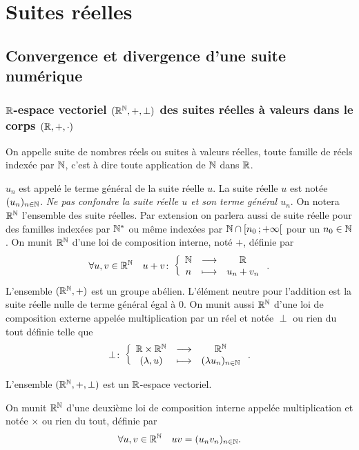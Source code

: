 \chapter{Suites  réelles}
\label{chap:suites}
\minitoc
\minilof
\minilot
\section{Convergence et divergence d'une suite numérique}

\subsection{\(\mathbb{R}\)-espace vectoriel \((\mathbb{R}^{\mathbb{N}},+,\perp)\) des suites réelles à valeurs dans le corps \((\mathbb{R},+, \cdot )\)}

\begin{defdef}
  On appelle suite de nombres réels ou suites à valeurs réelles, toute famille de réels indexée par \(\mathbb{N}\), c'est à dire toute application de \(\mathbb{N}\) dans \(\mathbb{R}\).
\end{defdef}
\(u_n\) est appelé le terme général de la suite réelle \(u\). La suite réelle \(u\) est notée \((u_n)_{n\in\mathbb{N}}\). \emph{Ne pas confondre la suite réelle \(u\) et son terme général \(u_n\)}. On notera \(\mathbb{R}^{\mathbb{N}}\) l'ensemble des suite réelles. Par extension on parlera aussi de suite réelle pour des familles indexées par \(\mathbb{N}^*\) ou même indexées par \(\mathbb{N} \cap \left[ n_0 \, ;  +\infty \right[\) pour un \(n_0 \in \mathbb{N}\). On munit \(\mathbb{R}^{\mathbb{N}}\) d'une loi de composition interne, noté \(+\), définie par
\begin{equation}
  \forall u,v \in \mathbb{R}^{\mathbb{N}} \quad u+v\colon \left\{\begin{array}{ccc} \mathbb{N} & \longrightarrow &\mathbb{R}\\ n & \longmapsto & u_n+v_n \end{array} \right..
\end{equation}
L'ensemble \((\mathbb{R}^{\mathbb{N}},+)\) est un groupe abélien. L'élément neutre pour l'addition est la suite réelle nulle de terme général égal à \(0\). On munit aussi \(\mathbb{R}^{\mathbb{N}}\) d'une loi de composition externe appelée multiplication par un réel et notée \(\perp\) ou rien du tout définie telle que
\begin{equation}
  \perp\colon \left\{\begin{array}{ccc} \mathbb{R}\times\mathbb{R}^{\mathbb{N}} & \longrightarrow &\mathbb{R}^{\mathbb{N}}\\ (\lambda,u) & \longmapsto & (\lambda u_n)_{n\in\mathbb{N}} \end{array} \right..
\end{equation}
\begin{prop}
  L'ensemble \((\mathbb{R}^{\mathbb{N}},+,\perp)\) est un \(\mathbb{R}\)-espace vectoriel.
\end{prop}
On munit \(\mathbb{R}^{\mathbb{N}}\) d'une deuxième loi de composition interne appelée multiplication et notée \(\times\) ou rien du tout, définie par
\begin{equation}
  \forall u,v \in \mathbb{R}^{\mathbb{N}} \quad uv = (u_nv_n)_{n\in \mathbb{N}}.
\end{equation}
